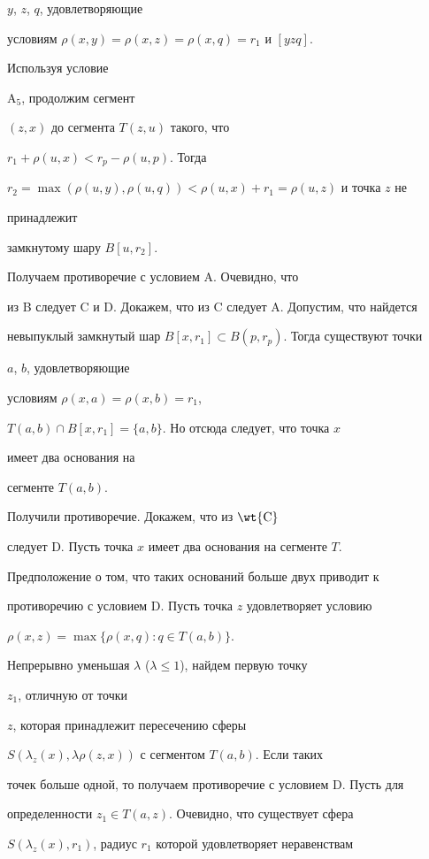 $y$, $z$, $q$, удовлетворяющие 


условиям $\rho(x,y)=\rho(x,z)=\rho(x,q)=r_1$ и $[yzq]$. 


Используя условие 


A${}_5$, продолжим сегмент 


$(z,x)$ до сегмента $T(z,u)$ такого, что 


$r_1+\rho(u,x)<r_p-\rho(u,p)$. Тогда 


$r_2=\max(\rho(u,y),\rho(u,q))<\rho(u,x)+r_1=\rho(u,z)$ и точка $z$ не 


принадлежит 


замкнутому шару $B[u,r_2]$. 


Получаем противоречие с условием A. Очевидно, что 


из B следует C и D. Докажем, что из C следует A. Допустим, что найдется


невыпуклый замкнутый шар $B[x,r_1]\subset B(p,r_p)$. Тогда существуют точки 


$a$, $b$, удовлетворяющие 


условиям $\rho(x,a)=\rho(x,b)=r_1$, 


$T(a,b)\cap B[x,r_1]=\{a,b\}$. Но отсюда следует, что точка $x$ 


имеет два основания на 


сегменте $T(a,b)$. 


Получили противоречие. Докажем, что из $\wt{\mathrm C}$ 


следует D. Пусть точка $x$ имеет два основания на сегменте $T$. 


Предположение о том, что таких оснований больше двух приводит к 


противоречию с условием D. Пусть точка $z$ удовлетворяет условию 


$\rho(x,z)=\max\{\rho(x,q):q\in T(a,b)\}$. 


Непрерывно уменьшая $\lambda$ ($\lambda\le 1$), найдем первую точку 


$z_1$, отличную от точки 


$z$, которая принадлежит пересечению сферы 


$S(\lambda_z(x),\lambda\rho(z,x))$ с сегментом $T(a,b)$. Если таких 


точек больше одной, то получаем противоречие с условием D. Пусть для 


определенности $z_1\in T(a,z)$. Очевидно, что существует сфера 


$S(\lambda_z(x),r_1)$, радиус $r_1$ которой удовлетворяет неравенствам 


